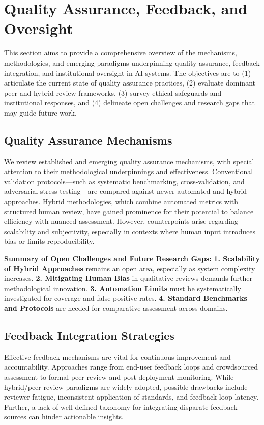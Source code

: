 \documentclass[sigconf]{acmart}
\begin{document}
\section{Quality Assurance, Feedback, and Oversight}

This section aims to provide a comprehensive overview of the mechanisms, methodologies, and emerging paradigms underpinning quality assurance, feedback integration, and institutional oversight in AI systems. The objectives are to (1) articulate the current state of quality assurance practices, (2) evaluate dominant peer and hybrid review frameworks, (3) survey ethical safeguards and institutional responses, and (4) delineate open challenges and research gaps that may guide future work.

\subsection{Quality Assurance Mechanisms}

We review established and emerging quality assurance mechanisms, with special attention to their methodological underpinnings and effectiveness. Conventional validation protocols—such as systematic benchmarking, cross-validation, and adversarial stress testing—are compared against newer automated and hybrid approaches. Hybrid methodologies, which combine automated metrics with structured human review, have gained prominence for their potential to balance efficiency with nuanced assessment. However, counterpoints arise regarding scalability and subjectivity, especially in contexts where human input introduces bias or limits reproducibility.

\textbf{Summary of Open Challenges and Future Research Gaps:}
\textbf{1. Scalability of Hybrid Approaches} remains an open area, especially as system complexity increases.
\textbf{2. Mitigating Human Bias} in qualitative reviews demands further methodological innovation.
\textbf{3. Automation Limits} must be systematically investigated for coverage and false positive rates.
\textbf{4. Standard Benchmarks and Protocols} are needed for comparative assessment across domains.

\subsection{Feedback Integration Strategies}

Effective feedback mechanisms are vital for continuous improvement and accountability. Approaches range from end-user feedback loops and crowdsourced assessment to formal peer review and post-deployment monitoring. While hybrid/peer review paradigms are widely adopted, possible drawbacks include reviewer fatigue, inconsistent application of standards, and feedback loop latency. Further, a lack of well-defined taxonomy for integrating disparate feedback sources can hinder actionable insights.
\end{document}
